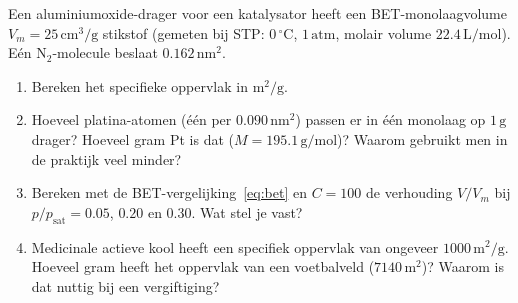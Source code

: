 \begin{oefening}
Een aluminiumoxide-drager voor een katalysator heeft een BET-monolaagvolume \(V_m = 25\,\mathrm{cm^3/g}\) stikstof (gemeten bij STP: \(0\,^\circ\mathrm{C}\), \(1\,\mathrm{atm}\), molair volume \(22.4\,\mathrm{L/mol}\)). Eén \(\mathrm{N_2}\)-molecule beslaat \(0.162\,\mathrm{nm^2}\).

\begin{enumerate}
\item[(a)]
  Bereken het specifieke oppervlak in \(\mathrm{m^2/g}\).
\item[(b)]
  Hoeveel platina-atomen (één per \(0.090\,\mathrm{nm^2}\)) passen er in één monolaag op \(1\,\mathrm{g}\) drager? Hoeveel gram Pt is dat (\(M = 195.1\,\mathrm{g/mol}\))? Waarom gebruikt men in de praktijk veel minder?
\item[(c)]
  Bereken met de BET-vergelijking~\eqref{eq:bet} en \(C = 100\) de verhouding \(V/V_m\) bij \(p/p_{\text{sat}} = 0.05\), \(0.20\) en \(0.30\). Wat stel je vast?
\item[(d)]
  Medicinale actieve kool heeft een specifiek oppervlak van ongeveer \(1000\,\mathrm{m^2/g}\). Hoeveel gram heeft het oppervlak van een voetbalveld (\(7140\,\mathrm{m^2}\))? Waarom is dat nuttig bij een vergiftiging?
\end{enumerate}
\end{oefening}

